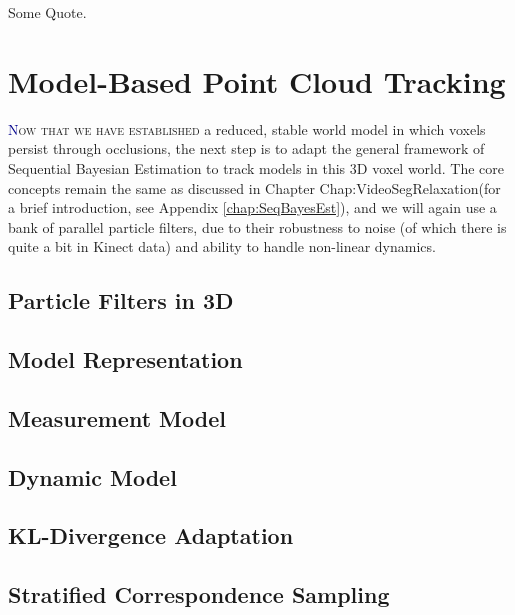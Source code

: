 \begin{savequote}[75mm]
Some Quote.
\end{savequote}

\chapter{Model-Based Point Cloud Tracking}
\label{Chap:ModelBasedTracking}
\lettrine[lines=3, loversize=0.3]{\textcolor{DarkBlue}N}{ow that we have established} a reduced, stable world model in which voxels persist through occlusions, the next step is to adapt the general framework of Sequential Bayesian Estimation to track models in this 3D voxel world. The core concepts remain the same as discussed in Chapter {Chap:VideoSegRelaxation}(for a brief introduction, see Appendix \ref{chap:SeqBayesEst}), and we will again use a bank of parallel particle filters, due to their robustness to noise (of which there is quite a bit in Kinect data) and ability to handle non-linear dynamics.

\section{Particle Filters in 3D}
\section{Model Representation}
\section{Measurement Model}
\section{Dynamic Model}
\section{KL-Divergence Adaptation}
\section{Stratified Correspondence Sampling}
